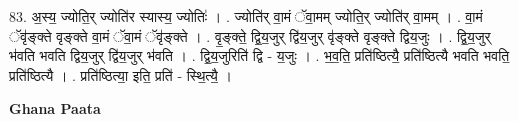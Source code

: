 \documentclass[17pt]{extarticle}
\begin{document}
83. अ॒स्य॒ ज्योति॒र् ज्योति॑र स्यास्य॒ ज्योतिः॑ । . ज्योति॑र् वा॒मं ॅवा॒मम् ज्योति॒र् ज्योति॑र् वा॒मम् । . वा॒मं ॅवृ॑ङ्क्ते वृङ्क्ते वा॒मं ॅवा॒मं ॅवृ॑ङ्क्ते । . वृ॒ङ्क्ते॒ द्वि॒य॒जुर् द्वि॑य॒जुर् वृ॑ङ्क्ते वृङ्क्ते द्विय॒जुः । . द्वि॒य॒जुर् भ॑वति भवति द्विय॒जुर् द्वि॑य॒जुर् भ॑वति । . द्वि॒य॒जुरिति॑ द्वि - य॒जुः । . भ॒व॒ति॒ प्रति॑ष्ठित्यै॒ प्रति॑ष्ठित्यै भवति भवति॒ प्रति॑ष्ठित्यै । . प्रति॑ष्ठित्या॒ इति॒ प्रति॑ - स्थि॒त्यै॒ । \newline

\textbf{Ghana Paata } \newline
\end{document}
